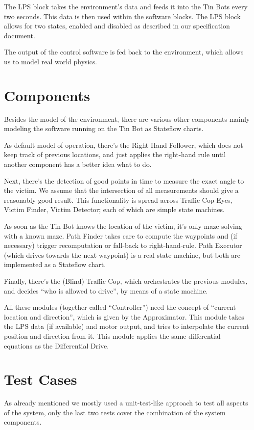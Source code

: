 \documentclass[a4paper,parskip,headheight=38pt]{scrartcl} %
\begin{document}
The LPS block takes the environment's data and feeds it into the Tin Bots every two seconds. This data is then used within the software blocks. The LPS block allows for two states, enabled and disabled as described in our specification document.

The output of the control software is fed back to the environment, which allows us to model real world physics.

\section{Components}
Besides the model of the environment, there are various other components mainly modeling the software running on the Tin Bot as Stateflow charts.

As default model of operation, there's the Right Hand Follower, which does not keep track of previous locations, and just applies the right-hand rule until another component has a better idea what to do.

Next, there's the detection of good points in time to measure the exact angle to the victim.  We assume that the intersection of all measurements should give a reasonably good result.  This functionality is spread across Traffic Cop Eyes, Victim Finder, Victim Detector; each of which are simple state machines.

As soon as the Tin Bot knows the location of the victim, it's only maze solving with a known maze.  Path Finder takes care to compute the waypoints and (if necessary) trigger recomputation or fall-back to right-hand-rule.  Path Executor (which drives towards the next waypoint) is a real state machine, but both are implemented as a Stateflow chart.

Finally, there's the (Blind) Traffic Cop, which orchestrates the previous modules, and decides \enquote{who is allowed to drive}, by means of a state machine.

All these modules (together called \enquote{Controller}) need the concept of \enquote{current location and direction}, which is given by the Approximator.  This module takes the LPS data (if available) and motor output, and tries to interpolate the current position and direction from it.  This module applies the same differential equations as the Differential Drive.

\section{Test Cases}
As already mentioned we mostly used a unit-test-like approach to test all aspects of the system, only the last two tests cover the combination of the system components.
\end{document}
